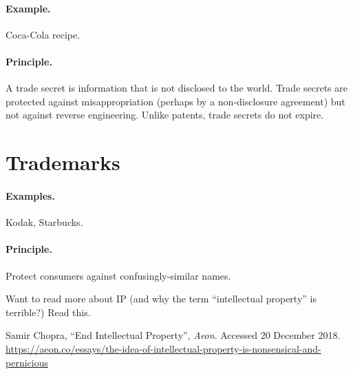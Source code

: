 \documentclass[11pt]{article}
\begin{document}
\paragraph{Example.} Coca-Cola recipe.

\paragraph{Principle.} A trade secret is information that is not disclosed to the world.
Trade secrets are protected against misappropriation (perhaps by a non-disclosure agreement)
but not against reverse engineering. Unlike patents, trade secrets do not expire.

\section*{Trademarks}
\paragraph{Examples.} Kodak, Starbucks.

\paragraph{Principle.} Protect consumers against confusingly-similar names.

Want to read more about IP (and why the term ``intellectual property'' is terrible?) Read this.

Samir Chopra, ``End Intellectual Property'', \emph{Aeon}. Accessed 20 December 2018. \url{https://aeon.co/essays/the-idea-of-intellectual-property-is-nonsensical-and-pernicious}
\end{document}
